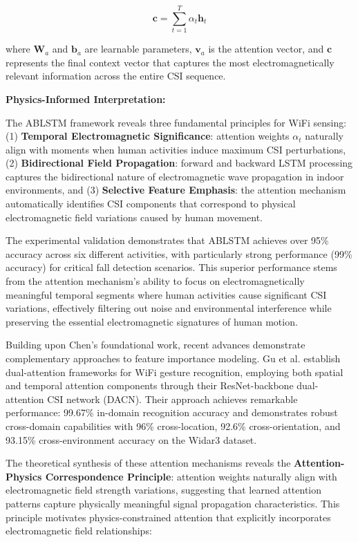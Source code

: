 \documentclass[journal]{IEEEtran}
\begin{document}
\begin{equation}
\mathbf{c} = \sum_{t=1}^{T} \alpha_t \mathbf{h}_t
\label{eq:ablstm_context}
\end{equation}

where $\mathbf{W}_a$ and $\mathbf{b}_a$ are learnable parameters, $\mathbf{v}_a$ is the attention vector, and $\mathbf{c}$ represents the final context vector that captures the most electromagnetically relevant information across the entire CSI sequence.

\textbf{Physics-Informed Interpretation:}

The ABLSTM framework reveals three fundamental principles for WiFi sensing: (1) \textbf{Temporal Electromagnetic Significance}: attention weights $\alpha_t$ naturally align with moments when human activities induce maximum CSI perturbations, (2) \textbf{Bidirectional Field Propagation}: forward and backward LSTM processing captures the bidirectional nature of electromagnetic wave propagation in indoor environments, and (3) \textbf{Selective Feature Emphasis}: the attention mechanism automatically identifies CSI components that correspond to physical electromagnetic field variations caused by human movement.

The experimental validation demonstrates that ABLSTM achieves over 95\% accuracy across six different activities, with particularly strong performance (99\% accuracy) for critical fall detection scenarios. This superior performance stems from the attention mechanism's ability to focus on electromagnetically meaningful temporal segments where human activities cause significant CSI variations, effectively filtering out noise and environmental interference while preserving the essential electromagnetic signatures of human motion.

Building upon Chen's foundational work, recent advances demonstrate complementary approaches to feature importance modeling. Gu et al. \cite{gu2022wigrunt} establish dual-attention frameworks for WiFi gesture recognition, employing both spatial and temporal attention components through their ResNet-backbone dual-attention CSI network (DACN). Their approach achieves remarkable performance: 99.67\% in-domain recognition accuracy and demonstrates robust cross-domain capabilities with 96\% cross-location, 92.6\% cross-orientation, and 93.15\% cross-environment accuracy on the Widar3 dataset.

The theoretical synthesis of these attention mechanisms reveals the \textbf{Attention-Physics Correspondence Principle}: attention weights naturally align with electromagnetic field strength variations, suggesting that learned attention patterns capture physically meaningful signal propagation characteristics. This principle motivates physics-constrained attention that explicitly incorporates electromagnetic field relationships:
\end{document}
